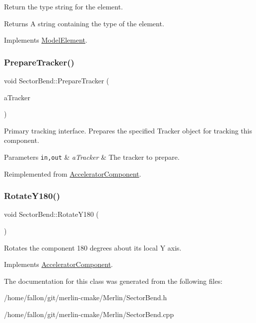 Return the type string for the element. \begin{DoxyReturn}{Returns}
A string containing the type of the element. 
\end{DoxyReturn}


Implements \hyperlink{classModelElement_a04dc2e51e1999fca612eb1838ec6b271}{Model\+Element}.

\mbox{\label{classSectorBend_a1278a47ce282b1229909304ac853fd22}} 
\subsubsection{\texorpdfstring{Prepare\+Tracker()}{PrepareTracker()}}
{\footnotesize\ttfamily void Sector\+Bend\+::\+Prepare\+Tracker (\begin{DoxyParamCaption}\item[{\hyperlink{classComponentTracker}{Component\+Tracker} \&}]{a\+Tracker }\end{DoxyParamCaption})\hspace{0.3cm}{\ttfamily [virtual]}}

Primary tracking interface. Prepares the specified Tracker object for tracking this component. 
\begin{DoxyParams}[1]{Parameters}
\mbox{\tt in,out}  & {\em a\+Tracker} & The tracker to prepare. \\
\hline
\end{DoxyParams}


Reimplemented from \hyperlink{classAcceleratorComponent_ab897c54689ac946f40c3ad0716ddd4bb}{Accelerator\+Component}.

\mbox{\label{classSectorBend_abd8059191bd4c947320b7fe5f6736e95}} 
\subsubsection{\texorpdfstring{Rotate\+Y180()}{RotateY180()}}
{\footnotesize\ttfamily void Sector\+Bend\+::\+Rotate\+Y180 (\begin{DoxyParamCaption}{ }\end{DoxyParamCaption})\hspace{0.3cm}{\ttfamily [virtual]}}

Rotates the component 180 degrees about its local Y axis. 

Implements \hyperlink{classAcceleratorComponent_a8bf0d39b56578ca99f286ca1504b9072}{Accelerator\+Component}.



The documentation for this class was generated from the following files\+:\begin{DoxyCompactItemize}
\item 
/home/fallon/git/merlin-\/cmake/\+Merlin/Sector\+Bend.\+h\item 
/home/fallon/git/merlin-\/cmake/\+Merlin/Sector\+Bend.\+cpp\end{DoxyCompactItemize}
